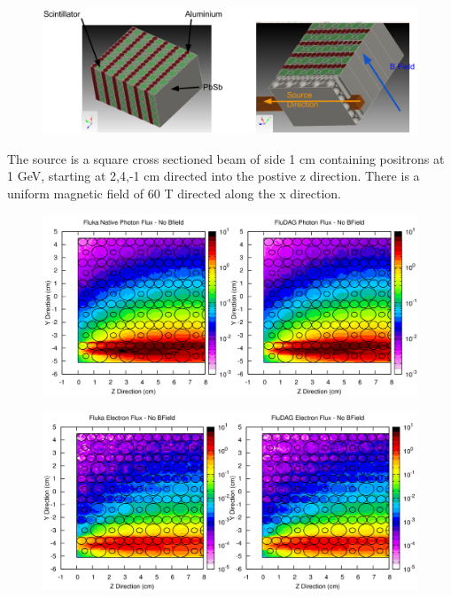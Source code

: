 \begin{figure}[ht!]
 \begin{centering}
 \centering
 \includegraphics[width=0.7\paperwidth]{../figs/magnsph_geom.png}
 \caption{}
 \label{fig:magnsph_geom}
 \end{centering}
\end{figure}

The source is a square cross sectioned beam of side 1 cm containing positrons at 1 GeV, starting at 2,4,-1 cm directed into the postive
z direction. There is a uniform magnetic field of 60 T directed along the x direction. 

\begin{figure}[ht!]
 \begin{centering}
 \centering
 \includegraphics[width=0.9\paperwidth,angle=90]{../figs/magnsph_photon_nob.png}
 \caption{}
 \label{fig:magnsph_photon_nob}
 \end{centering}
\end{figure}

\begin{figure}[ht!]
 \begin{centering}
 \centering
 \includegraphics[width=0.9\paperwidth,angle=90]{../figs/magnsph_electron_nob.png}
 \caption{}
 \label{fig:magnsph_electron_nob}
 \end{centering}
\end{figure}


